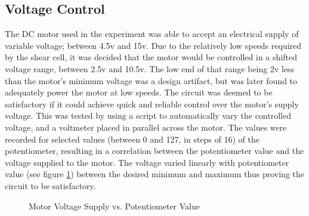 \documentclass[twoside,a4]{report}
\begin{document}
	\subsection{Voltage Control} %
	The DC motor used in the experiment was able to accept an electrical supply of variable voltage; between 4.5v and 15v. Due to the relatively low speeds required by the shear cell, it was decided that the motor would be controlled in a shifted voltage range, between 2.5v and 10.5v. 
The low end of that range being 2v less than the motor's minimum voltage was a design artifact, but was later found to adequately power the motor at low speeds. %
The circuit was deemed to be satisfactory if it could achieve quick and reliable control over the motor's supply voltage. This was tested by using a script to automatically vary the controlled voltage, and a voltmeter placed in parallel across the motor. The values were recorded for selected values (between 0 and 127, in steps of 16) of the potentiometer, resulting in a correlation between the potentiometer value and the voltage supplied to the motor. The voltage varied linearly with potentiometer value (see figure \ref{figvoltvval}) between the desired minimum and maximum thus proving the circuit to be satisfactory.
	\begin{figure}[!htb]
		\centering
		\caption{Motor Voltage Supply vs. Potentiometer Value}
		\label{figvoltvval}
	\end{figure} \newline  \noindent
\end{document}
